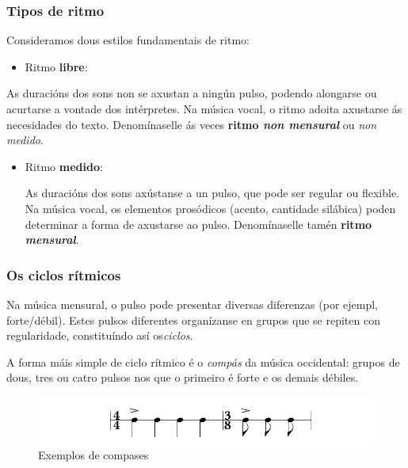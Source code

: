 \documentclass[a4paper, twoside]{templates/ociamthesis}
\providecommand{\tightlist}{%
  \setlength{\itemsep}{0pt}\setlength{\parskip}{0pt}}
\begin{document}
\hypertarget{tipos-de-ritmo}{%
\subsubsection{Tipos de ritmo}\label{tipos-de-ritmo}}

Consideramos dous estilos fundamentais de ritmo:

\begin{itemize}
\tightlist
\item
  Ritmo \textbf{libre}:
\end{itemize}

As duracións dos sons non se axustan a ningún pulso, podendo alongarse ou acurtarse a vontade dos intérpretes. Na música vocal, o ritmo adoita axustarse ás necesidades do texto. Denomínaselle ás veces \textbf{ritmo \emph{non mensural}} ou \emph{non medido}.

\begin{itemize}
\item
  Ritmo \textbf{medido}:

  As duracións dos sons axústanse a un pulso, que pode ser regular ou flexible. Na música vocal, os elementos prosódicos (acento, cantidade silábica) poden determinar a forma de axustarse ao pulso. Denomínaselle tamén \textbf{ritmo \emph{mensural}}.
\end{itemize}

\hypertarget{os-ciclos-ruxedtmicos}{%
\subsubsection{Os ciclos rítmicos}\label{os-ciclos-ruxedtmicos}}

Na música mensural, o pulso pode presentar diversas diferenzas (por ejempl, forte/débil). Estes pulsos diferentes organízanse en grupos que se repiten con regularidade, constituíndo así os\emph{ciclos}.

A forma máis simple de ciclo rítmico é o \emph{compás} da música occidental: grupos de dous, tres ou catro pulsos nos que o primeiro é forte e os demais débiles.

\begin{figure}
\centering
\includegraphics{figures/ud-03/compases.png}
\caption{Exemplos de compases}
\end{figure}
\end{document}
